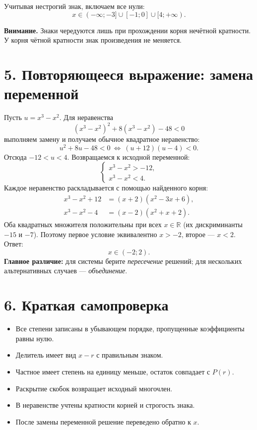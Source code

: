 \documentclass[a4paper,12pt]{article}
\newcommand{\R}{\mathbb{R}}
\newcommand{\lessonsection}[1]{\vspace{0.35em}\section*{\color{darkaccent}#1}\vspace{-0.75em}{\color{accent}\rule{\linewidth}{0.55pt}}\vspace{0.25em}}
\newcommand{\hint}[1]{\par\smallskip\textbf{Внимание.} #1\par}
\begin{document}
\begin{center}
\end{center}
Учитывая нестрогий знак, включаем все нули:
\[
\boxed{x\in(-\infty;-3]\cup[-1;0]\cup[4;+\infty).}
\]
\hint{Знаки чередуются лишь при прохождении корня нечётной кратности. У корня чётной кратности знак произведения не меняется.}

\lessonsection{5. Повторяющееся выражение: замена переменной}
Пусть $u=x^3-x^2$. Для неравенства
\[
(x^3-x^2)^2+8(x^3-x^2)-48<0
\]
выполняем замену и получаем обычное квадратное неравенство:
\[
u^2+8u-48<0\ \Longleftrightarrow\ (u+12)(u-4)<0.
\]
Отсюда $-12<u<4$. Возвращаемся к исходной переменной:
\[
\begin{cases}
x^3-x^2>-12,\\
x^3-x^2<4.
\end{cases}
\]
Каждое неравенство раскладывается с помощью найденного корня:
\[
\begin{aligned}
x^3-x^2+12&=(x+2)(x^2-3x+6),\\
x^3-x^2-4&=(x-2)(x^2+x+2).
\end{aligned}
\]
Оба квадратных множителя положительны при всех $x\in\R$ (их дискриминанты $-15$ и $-7$). Поэтому первое условие эквивалентно $x>-2$, второе --- $x<2$. Ответ:
\[
\boxed{x\in(-2;2).}
\]
\textbf{Главное различие:} для системы берите \emph{пересечение} решений; для нескольких альтернативных случаев --- \emph{объединение}.

\lessonsection{6. Краткая самопроверка}
\begin{itemize}
\item Все степени записаны в убывающем порядке, пропущенные коэффициенты равны нулю.
\item Делитель имеет вид $x-r$ с правильным знаком.
\item Частное имеет степень на единицу меньше, остаток совпадает с $P(r)$.
\item Раскрытие скобок возвращает исходный многочлен.
\item В неравенстве учтены кратности корней и строгость знака.
\item После замены переменной решение переведено обратно к $x$.
\end{itemize}
\end{document}
